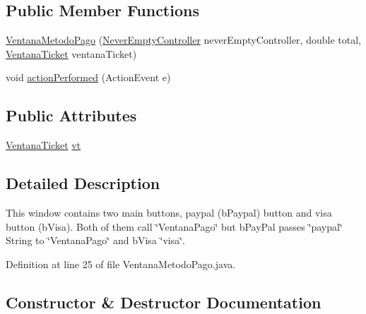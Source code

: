 \subsection*{Public Member Functions}
\begin{DoxyCompactItemize}
\item 
\mbox{\hyperlink{class_s_p_q_1_1gui_1_1_ventana_metodo_pago_a26f9c85826129e253d02d7faa3b6f329}{Ventana\+Metodo\+Pago}} (\mbox{\hyperlink{class_s_p_q_1_1controller_1_1_never_empty_controller}{Never\+Empty\+Controller}} never\+Empty\+Controller, double total, \mbox{\hyperlink{class_s_p_q_1_1gui_1_1_ventana_ticket}{Ventana\+Ticket}} ventana\+Ticket)
\item 
void \mbox{\hyperlink{class_s_p_q_1_1gui_1_1_ventana_metodo_pago_a4cd83e327c681f60072c75b63bfb937d}{action\+Performed}} (Action\+Event e)
\end{DoxyCompactItemize}
\subsection*{Public Attributes}
\begin{DoxyCompactItemize}
\item 
\mbox{\hyperlink{class_s_p_q_1_1gui_1_1_ventana_ticket}{Ventana\+Ticket}} \mbox{\hyperlink{class_s_p_q_1_1gui_1_1_ventana_metodo_pago_aaad8d1f40f23d404c13feabdbf63e248}{vt}}
\end{DoxyCompactItemize}


\subsection{Detailed Description}
This window contains two main buttons, paypal (b\+Paypal) button and visa button (b\+Visa). Both of them call \char`\"{}\+Ventana\+Pago\char`\"{} but b\+Pay\+Pal passes \char`\"{}paypal\char`\"{} String to \char`\"{}\+Ventana\+Pago\char`\"{} and b\+Visa \char`\"{}visa\char`\"{}. 

Definition at line 25 of file Ventana\+Metodo\+Pago.\+java.



\subsection{Constructor \& Destructor Documentation}
\mbox{\label{class_s_p_q_1_1gui_1_1_ventana_metodo_pago_a26f9c85826129e253d02d7faa3b6f329}} 
